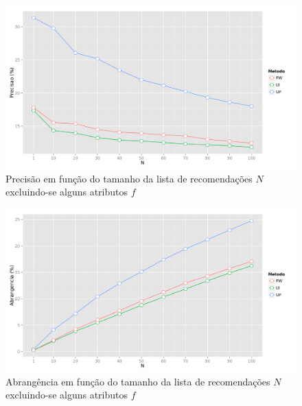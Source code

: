 {\begin{figure}[hp]
    \begin{center}
    \includegraphics[width=1\textwidth]{img/precision_N_F}
    \end{center}
    \caption{Precisão em função do tamanho da lista de recomendações $N$ excluindo-se alguns atributos $f$}
    \label{fig:precision_N_F}
\end{figure}


\begin{figure}[hp]
    \begin{center}
    \includegraphics[width=1\textwidth]{img/recall_N_F}
    \end{center}
    \caption{Abrangência em função do tamanho da lista de recomendações $N$ excluindo-se alguns atributos $f$}
    \label{fig:recall_N_F}
\end{figure}

}
